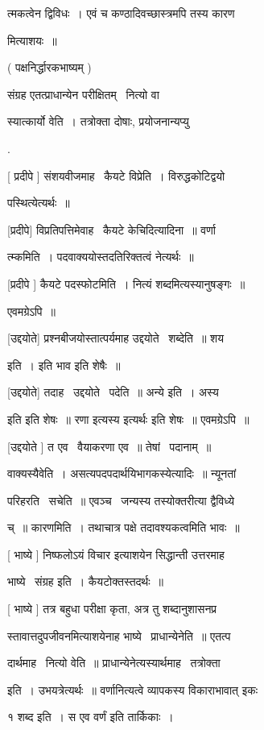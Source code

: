 \documentclass[11pt, openany]{book}
\begin{document}
त्मकत्वेन द्विविधः~। एवं च कण्ठादिवच्छास्त्रमपि तस्य कारण \textendash\ 

मित्याशयः~॥ 

( पक्षनिर्द्धारकभाष्यम् ) 

संग्रह एतत्प्राधान्येन परीक्षितम् \textendash\ नित्यो वा 

स्यात्कार्यो वेति~। तत्रोक्ता दोषाः, प्रयोजनान्यप्यु \textendash\ 

. \textendash\ 

[ प्रदीपे ] संशयवीजमाह \textendash\ कैयटे विप्रेति~। विरुद्धकोटिद्वयो \textendash\ 

पस्थित्येत्यर्थः~॥ 

[प्रदीपे] विप्रतिपत्तिमेवाह \textendash\ कैयटे केचिदित्यादिना~॥ वर्णा \textendash\ 

त्म्कमिति~। पदवाक्ययोस्तदतिरिक्तत्वं नेत्यर्थः~॥ 

[प्रदीपे ] कैयटे पदस्फोटमिति~। नित्यं शब्दमित्यस्यानुषङ्गः~॥ 

एवमग्रेऽपि~॥ 

[उद्दयोते] प्रश्नबीजयोस्तात्पर्यमाह उद्दयोते \textendash\ शब्देति~॥ शय 

इति~। इति भाव इति शेषैः~॥ 

[उद्दयोते] तदाह \textendash\ उद्दयोते \textendash\ पदेति~॥ अन्ये इति~। अस्य 

{\qt इति} इति शेषः~॥ रणा इत्यस्य {\qt इत्यर्थः} इति शेषः~॥ एवमग्रेऽपि~॥ 

[उद्दयोते ] त एव \textendash\ वैयाकरणा एव~॥ तेषां \textendash\ पदानाम्~॥ 

वाक्यस्यैवेति~। असत्यपदपदार्थयिभागकस्येत्यादिः~॥ न्यूनतां 

परिहरति \textendash\ सचेति~॥ एवञ्च \textendash\ जन्यस्य तस्योक्तरीत्या द्वैविध्ये 

च्~॥ कारणमिति~। तथाचात्र पक्षे तदावश्यकत्वमिति भावः~॥ 

[ भाष्ये ] निष्फलोऽयं विचार इत्याशयेन सिद्धान्ती उत्तरमाह \textendash\ 

भाष्ये \textendash\ संग्रह इति~। कैयटोक्तस्तदर्थः~॥ 

[ भाष्ये ] तत्र बहुधा परीक्षा कृता, अत्र तु शब्दानुशासनप्र \textendash\ 

स्तावात्तदुपजीवनमित्याशयेनाह भाष्ये \textendash\ प्राधान्येनेति~॥ एतत्प \textendash\ 

दार्थमाह \textendash\ नित्यो वेति~॥ प्राधान्येनेत्यस्यार्थमाह \textendash\ तत्रोक्ता 

इति~। उभयत्रेत्यर्थः~॥ वर्णानित्यत्वे व्यापकस्य विकाराभावात् इकः 

१ शब्द इति~। स एव वर्णं इति तार्किकाः~। 
\end{document}
